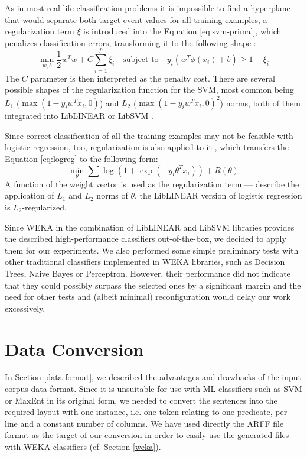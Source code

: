\documentclass[12pt,notitlepage]{report}
\begin{document}
As in most real-life classification problems it is impossible to find a hyperplane that would separate both target event values for all training examples, a regularization \citep{neumaier98} term $\xi$ is introduced into the Equation \ref{eq:svm-primal}, which penalizes classification errors, transforming it to the following shape \citep{cortes95}:
\begin{equation}
\min_{w,b} \frac{1}{2}w^T w + C\sum_{i=1}^p \xi_i \quad\mbox{subject to}\quad y_i(w^T\phi(x_i) + b)\geq 1 - \xi_i
\end{equation}
The $C$ parameter is then interpreted as the penalty cost. There are several possible shapes of the regularization function for the SVM, most common being $L_1$ ($\max(1-y_i w^T x_i, 0)$) and $L_2$ ($\max(1-y_i w^T x_i, 0)^2$) norms, both of them integrated into LibLINEAR or LibSVM \citep{fan08,chang01}.

Since correct classification of all the training examples may not be feasible with logistic regression, too, regularization is also applied to it \citep{ng04,fan08}, which transfers the Equation \ref{eq:logreg} to the following form:
\begin{equation}
\min_\theta \sum\log(1 + \exp(-y_i\theta^T x_i)) + R(\theta)
\end{equation}
A function of the weight vector is used as the regularization term --- \citet{ng04} describe the application of $L_1$ and $L_2$ norms of $\theta$, the LibLINEAR version of logistic regression is $L_2$-regularized.

Since WEKA in the combination of LibLINEAR and LibSVM libraries provides the described high-performance classifiers out-of-the-box, we decided to apply them for our experiments. We also performed some simple preliminary tests with other traditional classifiers implemented in WEKA libraries, such as Decision Trees, Naive Bayes or Perceptron. However, their performance did not indicate that they could possibly surpass the selected ones by a significant margin and the need for other tests and (albeit minimal) reconfiguration would delay our work excessively.

\section{Data Conversion}\label{conversion}

In Section \ref{data-format}, we described the advantages and drawbacks of the input corpus data format. Since it is unsuitable for use with ML classifiers such as SVM or MaxEnt in its original form, we needed to convert the sentences into the required layout with one instance, i.e. one token relating to one predicate, per line and a constant number of columns. We have used directly the ARFF file format as the target of our conversion in order to easily use the generated files with WEKA classifiers (cf. Section \ref{weka}).
\end{document}
